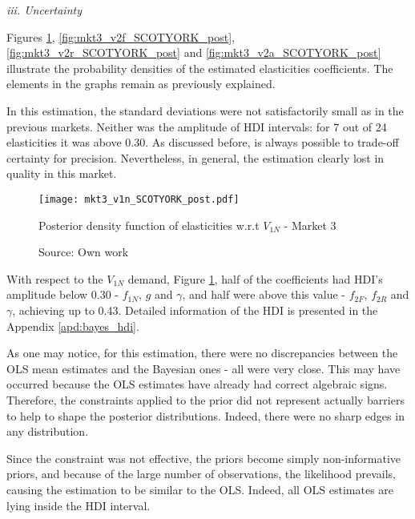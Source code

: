 

\textit{iii. Uncertainty}

Figures \ref{fig:mkt3_v1n_SCOTYORK_post}, \ref{fig:mkt3_v2f_SCOTYORK_post}, \ref{fig:mkt3_v2r_SCOTYORK_post} and \ref{fig:mkt3_v2a_SCOTYORK_post} illustrate the probability densities of the estimated elasticities coefficients. The elements in the graphs remain as previously explained. 

In this estimation, the standard deviations were not satisfactorily small as in the previous markets. Neither was the amplitude of HDI intervals: for 7 out of 24 elasticities it was above 0.30. As discussed before, is always possible to trade-off certainty for precision. Nevertheless, in general, the estimation clearly lost in quality in this market. 


\begin{figure}[H]
\centering
\texttt{[image: mkt3\_v1n\_SCOTYORK\_post.pdf]}
\caption{Posterior density function of elasticities w.r.t $V_{1N}$ - Market 3}
\label{fig:mkt3_v1n_SCOTYORK_post}
\caption*{Source: Own work}
\end{figure} 

With respect to the $V_{1N}$ demand, Figure \ref{fig:mkt3_v1n_SCOTYORK_post}, half of the coefficients had HDI's amplitude below 0.30 - $f_{1N}$, $g$ and $\gamma$, and half were above this value - $f_{2F}$, $f_{2R}$ and $\gamma$, achieving up to 0.43. Detailed information of the HDI is presented in the Appendix \ref{apd:bayes_hdi}. 

As one may notice, for this estimation, there were no discrepancies between the OLS mean estimates and the Bayesian ones - all were very close. This may have occurred because the OLS estimates have already had correct algebraic signs. Therefore, the constraints applied to the prior did not represent actually barriers to help to shape the posterior distributions. Indeed, there were no sharp edges in any distribution. 

Since the constraint was not effective, the priors become simply non-informative priors, and because of the large number of observations, the likelihood prevails, causing the estimation to be similar to the OLS. Indeed, all OLS estimates are lying inside the HDI interval.

